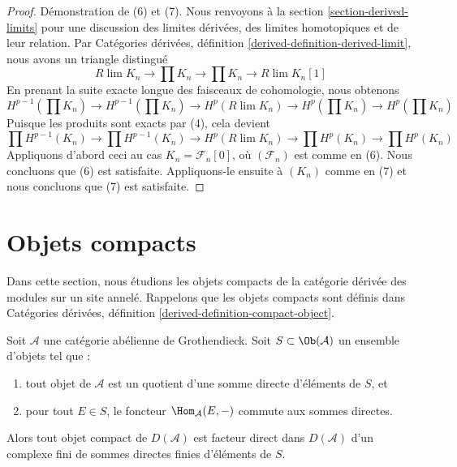 \begin{proof}
\medskip\noindent
Démonstration de (6) et (7). Nous renvoyons à la section
\ref{section-derived-limits} pour une discussion des limites dérivées, des
limites homotopiques et de leur relation. Par Catégories dérivées, définition
\ref{derived-definition-derived-limit}, nous avons un triangle distingué
$$
R\lim K_n \to \prod K_n \to \prod K_n \to R\lim K_n[1]
$$
En prenant la suite exacte longue des faisceaux de cohomologie, nous obtenons
$$
H^{p - 1}(\prod K_n) \to H^{p - 1}(\prod K_n) \to
H^p(R\lim K_n) \to H^p(\prod K_n) \to H^p(\prod K_n)
$$
Puisque les produits sont exacts par (4), cela devient
$$
\prod H^{p - 1}(K_n) \to \prod H^{p - 1}(K_n) \to
H^p(R\lim K_n) \to \prod H^p(K_n) \to \prod H^p(K_n)
$$
Appliquons d'abord ceci au cas $K_n = \mathcal{F}_n[0]$, où
$(\mathcal{F}_n)$ est comme en (6). Nous concluons que (6) est satisfaite.
Appliquons-le ensuite à $(K_n)$ comme en (7) et nous concluons que (7) est
satisfaite.
\end{proof}






\section{Objets compacts}
\label{section-compact}

\noindent
Dans cette section, nous étudions les objets compacts de la catégorie dérivée
des modules sur un site annelé. Rappelons que les objets compacts sont définis
dans Catégories dérivées, définition \ref{derived-definition-compact-object}.

\begin{lemma}
\label{lemma-compact-in-terms-of-generators}
Soit $\mathcal{A}$ une catégorie abélienne de Grothendieck. Soit
$S \subset \Ob(\mathcal{A})$ un ensemble d'objets tel que :
\begin{enumerate}
\item tout objet de $\mathcal{A}$ est un quotient d'une somme directe
d'éléments de $S$, et
\item pour tout $E \in S$, le foncteur $\Hom_\mathcal{A}(E, -)$ commute aux
sommes directes.
\end{enumerate}
Alors tout objet compact de $D(\mathcal{A})$ est facteur direct dans
$D(\mathcal{A})$ d'un complexe fini de sommes directes finies d'éléments de
$S$.
\end{lemma}

